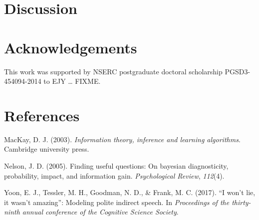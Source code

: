 \documentclass[10pt, letterpaper]{article}
\begin{document}
\section{Discussion}\label{discussion}

\section{Acknowledgements}\label{acknowledgements}

This work was supported by NSERC postgraduate doctoral scholarship
PGSD3-454094-2014 to EJY \ldots{} FIXME.

\section{References}\label{references}

\setlength{\parindent}{-0.1in} \setlength{\leftskip}{0.125in} \noindent

\hypertarget{refs}{}
\hypertarget{ref-mackay2003}{}
MacKay, D. J. (2003). \emph{Information theory, inference and learning
algorithms}. Cambridge university press.

\hypertarget{ref-nelson2005}{}
Nelson, J. D. (2005). Finding useful questions: On bayesian
diagnosticity, probability, impact, and information gain.
\emph{Psychological Review}, \emph{112}(4).

\hypertarget{ref-yoon2017}{}
Yoon, E. J., Tessler, M. H., Goodman, N. D., \& Frank, M. C. (2017). ``I
won't lie, it wasn't amazing'': Modeling polite indirect speech. In
\emph{Proceedings of the thirty-ninth annual conference of the Cognitive
Science Society}.
\end{document}
